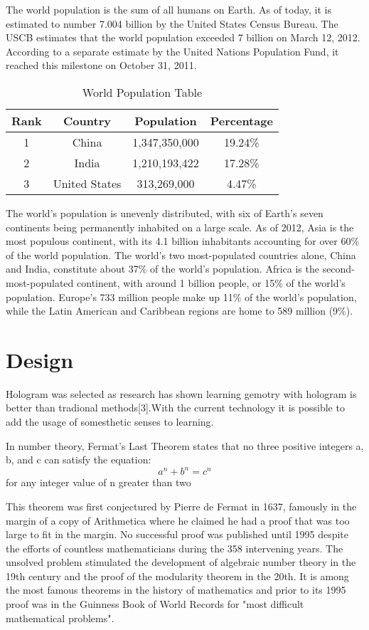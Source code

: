 \documentclass{fisatproject}
\begin{document}
The world population is the sum of all humans on Earth. As of today, it is estimated to number 7.004 billion by the United States Census Bureau. The USCB estimates that the world population exceeded 7 billion on March 12, 2012. According to a separate estimate by the United Nations Population Fund, it reached this milestone on October 31, 2011.
\begin{table}[h!]
\begin{center}
\begin{tabular}{|c|c|c|c|}
\hline Rank & Country & Population  & Percentage  \\ 
\hline 1 & China & 1,347,350,000 & 19.24\% \\ 
\hline 2 & India & 1,210,193,422  & 17.28\% \\ 
\hline 3 & United States & 313,269,000 & 4.47\% \\ 
\hline 
\end{tabular}
\caption{World Population Table} 
\end{center}
\end{table}
The world's population is unevenly distributed, with six of Earth's seven continents being permanently inhabited on a large scale. As of 2012, Asia is the most populous continent, with its 4.1 billion inhabitants accounting for over 60\% of the world population. The world's two most-populated countries alone, China and India, constitute about 37\% of the world's population. Africa is the second-most-populated continent, with around 1 billion people, or 15\% of the world's population. Europe's 733 million people make up 11\% of the world's population, while the Latin American and Caribbean regions are home to 589 million (9\%).


\chapter{Design}

Hologram was selected as research has shown learning gemotry with hologram is better than tradional methods[3].With the current technology it is possible to add the usage of somesthetic senses to learning.


In number theory, Fermat's Last Theorem states that no three positive integers a, b, and c can satisfy the equation:
$$
a^{n} + b^{n} = c^{n}
$$ 
for any integer value of n greater than two 

This theorem was first conjectured by Pierre de Fermat in 1637, famously in the margin of a copy of Arithmetica where he claimed he had a proof that was too large to fit in the margin. No successful proof was published until 1995 despite the efforts of countless mathematicians during the 358 intervening years. The unsolved problem stimulated the development of algebraic number theory in the 19th century and the proof of the modularity theorem in the 20th. It is among the most famous theorems in the history of mathematics and prior to its 1995 proof was in the Guinness Book of World Records for "most difficult mathematical problems".
\end{document}
